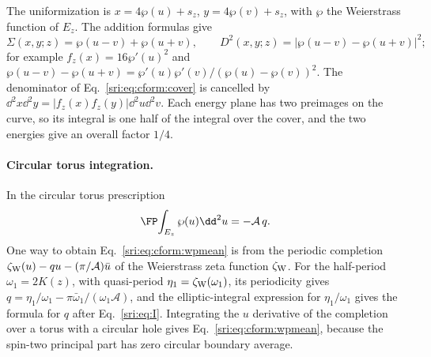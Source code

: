 The uniformization is $x=4\wp(u)+s_z$, $y=4\wp(v)+s_z$, with $\wp$ the Weierstrass function of $E_z$. The addition
formulas give
\begin{equation}
 \Sigma(x,y;z)=\wp(u-v)+\wp(u+v),\qquad D^2(x,y;z)=|\wp(u-v)-\wp(u+v)|^2;
 \label{sri:eq:cform:addition}
\end{equation}
for example $f_z(x)=16\wp'(u)^2$ and $\wp(u-v)-\wp(u+v)=\wp'(u)\wp'(v)/(\wp(u)-\wp(v))^2$. The denominator of
Eq.~\eqref{sri:eq:cform:cover} is cancelled by $\dd^2x\dd^2y=|f_z(x)f_z(y)|\dd^2u\dd^2v$. Each energy plane has two
preimages on the curve, so its integral is one half of the integral over the cover, and the two energies give an
overall factor $1/4$.

\paragraph{Circular torus integration.} In the circular torus prescription
\begin{equation}
 \FP\!\int_{E_z}\wp(u)\dd^2u=-\mathcal A\,q.
 \label{sri:eq:cform:wpmean}
\end{equation}
One way to obtain Eq.~\eqref{sri:eq:cform:wpmean} is from the periodic completion
$\zeta_{\rm W}(u)-qu-(\pi/\mathcal A)\bar u$ of the Weierstrass zeta function $\zeta_{\rm W}$. For the half-period
$\omega_1=2K(z)$, with quasi-period $\eta_1=\zeta_{\rm W}(\omega_1)$, its periodicity gives
$q=\eta_1/\omega_1-\pi\bar\omega_1/(\omega_1\mathcal A)$, and the elliptic-integral expression for $\eta_1/\omega_1$
gives the formula for $q$ after Eq.~\eqref{sri:eq:I}. Integrating the $u$ derivative of the completion over a torus with a
circular hole gives Eq.~\eqref{sri:eq:cform:wpmean}, because the spin-two principal part has zero circular boundary
average.

